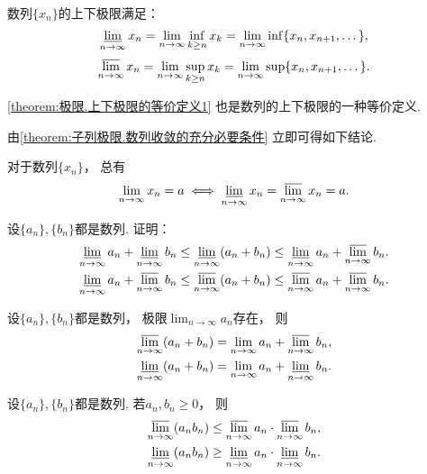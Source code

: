 \begin{theorem}\label{theorem:极限.上下极限的等价定义1}
数列\(\{x_n\}\)的上下极限满足：\[
	\varliminf_{n\to\infty} x_n
	= \lim_{n\to\infty} \inf_{k\geq n} x_k
	= \lim_{n\to\infty} \inf\{x_n,x_{n+1},\dotsc\},
\]\[
	\varlimsup_{n\to\infty} x_n
	= \lim_{n\to\infty} \sup_{k\geq n} x_k
	= \lim_{n\to\infty} \sup\{x_n,x_{n+1},\dotsc\}.
\]
\end{theorem}
\cref{theorem:极限.上下极限的等价定义1}
也是数列的上下极限的一种等价定义.

由\cref{theorem:子列极限.数列收敛的充分必要条件} 立即可得如下结论.
\begin{corollary}
对于数列\(\{x_n\}\)，
总有\[
	\lim_{n\to\infty} x_n = a
	\iff
	\varliminf_{n\to\infty} x_n
	= \varlimsup_{n\to\infty} x_n
	= a.
\]
\end{corollary}

\begin{example}
设\(\{a_n\},\{b_n\}\)都是数列.
证明：\begin{gather}
	\varliminf_{n\to\infty} a_n
	+ \varliminf_{n\to\infty} b_n
	\leq \varliminf_{n\to\infty} (a_n + b_n)
	\leq \varliminf_{n\to\infty} a_n
	+ \varlimsup_{n\to\infty} b_n. \\
	\varliminf_{n\to\infty} a_n
	+ \varlimsup_{n\to\infty} b_n
	\leq \varlimsup_{n\to\infty} (a_n + b_n)
	\leq \varlimsup_{n\to\infty} a_n
	+ \varlimsup_{n\to\infty} b_n.
\end{gather}
\end{example}

\begin{example}
设\(\{a_n\},\{b_n\}\)都是数列，
极限\(\lim_{n\to\infty} a_n\)存在，
则\begin{gather*}
	\varlimsup_{n\to\infty} (a_n + b_n)
	= \lim_{n\to\infty} a_n + \varlimsup_{n\to\infty} b_n, \\
	\varliminf_{n\to\infty} (a_n + b_n)
	= \lim_{n\to\infty} a_n + \varliminf_{n\to\infty} b_n.
\end{gather*}
\end{example}

\begin{example}
设\(\{a_n\},\{b_n\}\)都是数列.
若\(a_n,b_n\geq0\)，
则\begin{gather*}
	\varlimsup_{n\to\infty} (a_n b_n)
	\leq \varlimsup_{n\to\infty} a_n \cdot \varlimsup_{n\to\infty} b_n, \\
	\varliminf_{n\to\infty} (a_n b_n)
	\geq \varliminf_{n\to\infty} a_n \cdot \varliminf_{n\to\infty} b_n.
\end{gather*}
\end{example}

